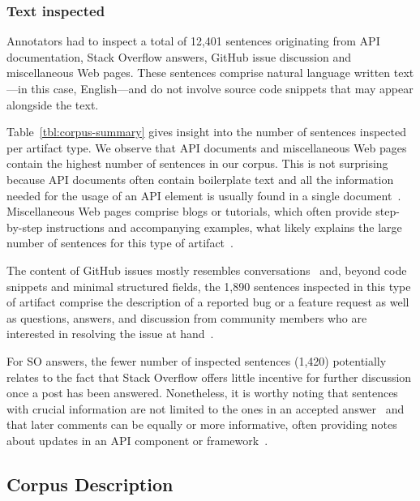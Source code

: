 \subsubsection{Text inspected}





Annotators had to inspect a total of 12,401 sentences originating from API documentation, Stack Overflow answers, GitHub issue discussion and miscellaneous Web pages.
These sentences comprise natural language written text---in this case, English---and do not involve source code snippets that may appear alongside the text.


Table~\ref{tbl:corpus-summary} gives insight into the number of sentences inspected per artifact type. 
We observe that API documents and miscellaneous Web pages contain the highest number of sentences in our corpus.
This is not surprising because API documents often contain boilerplate text 
and all the information needed for the usage of an API element is usually found in a single document~\cite{robillard2011field}.
Miscellaneous Web pages comprise blogs or tutorials, 
which often provide step-by-step instructions and accompanying examples, 
what likely explains the large number of sentences for this type of artifact~\cite{arya2020, Jiang2016b}.


The content of GitHub issues mostly resembles conversations~\cite{Rastkar2010}
and, beyond code snippets and minimal structured fields, the 
1,890 sentences inspected in this type of artifact comprise the description of a reported bug or a feature request as well as questions, answers, and discussion from  community members who are interested in resolving the issue at hand~\cite{zimmermann2010}.



For SO answers, the fewer number of inspected sentences (1,420) potentially relates to 
the fact that Stack Overflow offers little incentive for further discussion once a post has been answered.
Nonetheless, it is worthy noting that sentences with crucial information 
are not limited to the ones in an accepted answer~\cite{nadi2020}
and that later comments can be equally or more informative,
often providing notes about updates in an API component or framework~\cite{zhang2019so}.









\subsection{Corpus Description}

